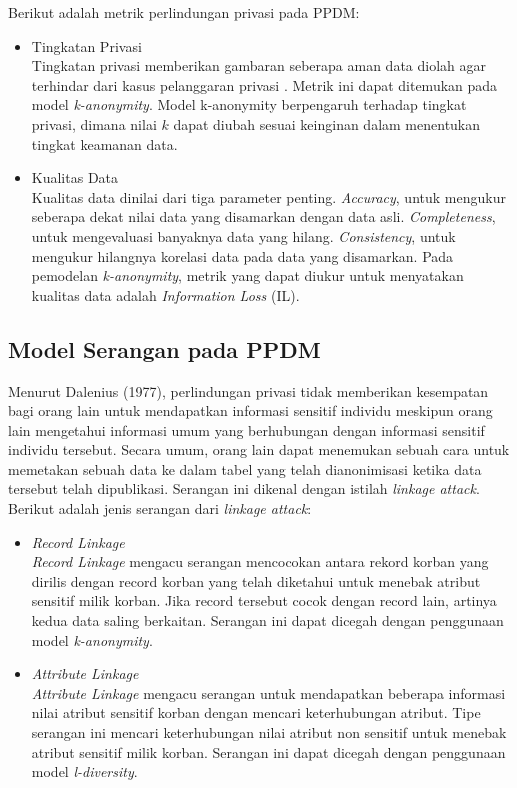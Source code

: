 \noindent Berikut adalah metrik perlindungan privasi pada PPDM:

\begin{itemize}

\item Tingkatan Privasi \\
Tingkatan privasi memberikan gambaran seberapa aman data diolah agar terhindar dari kasus pelanggaran privasi . Metrik ini dapat ditemukan pada model {\it k-anonymity}. Model k-anonymity berpengaruh terhadap tingkat privasi, dimana nilai $k$ dapat diubah sesuai keinginan dalam menentukan tingkat keamanan data.

\item Kualitas Data\\
Kualitas data dinilai dari tiga parameter penting. {\it Accuracy}, untuk mengukur seberapa dekat nilai data yang disamarkan dengan data asli. {\it Completeness}, untuk mengevaluasi banyaknya data yang hilang. {\it Consistency}, untuk mengukur hilangnya korelasi data pada data yang disamarkan. Pada pemodelan {\it k-anonymity}, metrik yang dapat diukur untuk menyatakan kualitas data adalah {\it Information Loss} (IL).

\end{itemize}

\subsection{Model Serangan pada PPDM}
Menurut Dalenius (1977), perlindungan privasi tidak memberikan kesempatan bagi orang lain untuk mendapatkan informasi sensitif individu meskipun orang lain mengetahui informasi umum yang berhubungan dengan informasi sensitif individu tersebut. Secara umum, orang lain dapat menemukan sebuah cara untuk memetakan sebuah data ke dalam tabel yang telah dianonimisasi ketika data tersebut telah dipublikasi. Serangan ini dikenal dengan istilah \textit{linkage attack}. \\

\noindent Berikut adalah jenis serangan dari \textit{linkage attack}:

\begin{itemize}

\item \textit{Record Linkage}\\
\textit{Record Linkage} mengacu serangan mencocokan antara rekord korban yang dirilis dengan record korban yang telah diketahui untuk menebak atribut sensitif milik korban. Jika record tersebut cocok dengan record lain, artinya kedua data saling berkaitan. Serangan ini dapat dicegah dengan penggunaan model {\it k-anonymity}.
 
\item \textit{Attribute Linkage}\\
\textit{Attribute Linkage} mengacu serangan untuk mendapatkan beberapa informasi  nilai atribut sensitif korban dengan mencari keterhubungan atribut. Tipe serangan ini  mencari keterhubungan nilai atribut non sensitif untuk menebak atribut sensitif milik korban. Serangan ini dapat dicegah dengan penggunaan model {\it l-diversity}.

\end{itemize}

